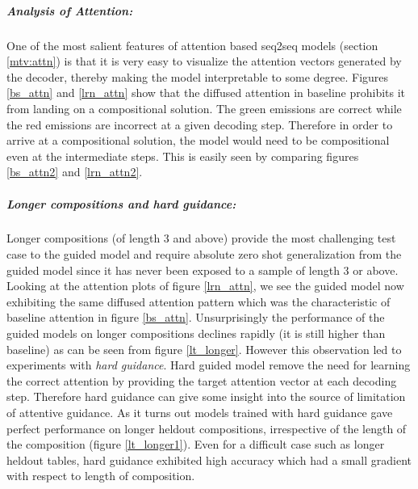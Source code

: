 \subparagraph{Analysis of Attention:} One of the most salient features of attention based seq2seq models (section \ref{mtv:attn}) is that it is very easy to visualize the attention vectors generated by the decoder, thereby making the model interpretable to some degree. Figures \ref{bs_attn} and \ref{lrn_attn} show that the diffused attention in baseline prohibits it from landing on a compositional solution. The green emissions are correct while the red emissions are incorrect at a given decoding step. Therefore in order to arrive at a compositional solution, the model would need to be compositional even at the intermediate steps. This is easily seen by comparing figures \ref{bs_attn2} and \ref{lrn_attn2}.

\subparagraph{Longer compositions and hard guidance:} Longer compositions (of length 3 and above) provide the most challenging test case to the guided model and require absolute zero shot generalization from the guided model since it has never been exposed to a sample of length 3 or above. Looking at the attention plots of figure \ref{lrn_attn}, we see the guided model now exhibiting the same diffused attention pattern which was the characteristic of baseline attention in figure \ref{bs_attn}. Unsurprisingly the performance of the guided models on longer compositions declines rapidly (it is still higher than baseline) as can be seen from figure \ref{lt_longer}.
However this observation led to experiments with \textit{hard guidance}. Hard guided model remove the need for learning the correct attention by providing the target attention vector at each decoding step. Therefore hard guidance can give some insight into the source of limitation of attentive guidance. As it turns out models trained with hard guidance gave perfect performance on longer heldout compositions, irrespective of the length of the composition (figure \ref{lt_longer1}). Even for a difficult case such as longer heldout tables, hard guidance exhibited high accuracy which had a small gradient with respect to length of composition. 


